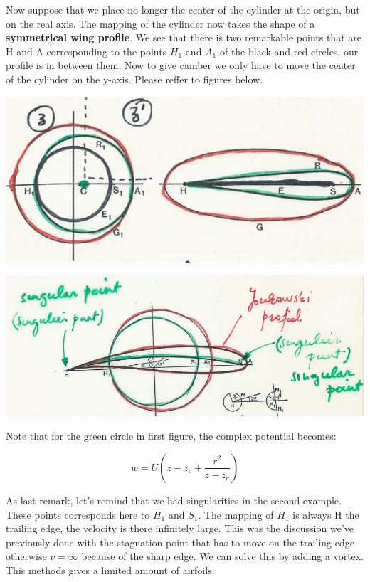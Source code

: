 		Now suppose that we place no longer the center of the cylinder at the origin, but on the real axis. The mapping of the cylinder now takes the shape of a \textbf{symmetrical wing profile}. We see that there is two remarkable points that are H and A corresponding to the points $H_1$ and $A_1$ of the black and red circles, our profile is in between them. Now to give camber we only have to move the center of the cylinder on the y-axis. Please reffer to figures below. 
		
		\begin{center}
		\begin{minipage}{0.45\textwidth}
		\includegraphics[scale=0.4]{ch2/31}
		\end{minipage}
		\begin{minipage}{0.45\textwidth}
		\includegraphics[scale=0.3]{ch2/32}
		\end{minipage}
		\end{center}
		
		Note that for the green circle in first figure, the complex potential becomes:
		
		\begin{equation}
		w = U\left( z-z_c + \frac{r^2}{z-z_c} \right)
		\end{equation}
		
		As last remark, let's remind that we had singularities in the second example. These points corresponds here to $H_1$ and $S_1$. The mapping of $H_1$ is always H the trailing edge, the velocity is there infinitely large. This was the discussion we've previously done with the stagnation point that has to move on the trailing edge otherwise $v = \infty$ because of the sharp edge. We can solve this by adding a vortex. This methods gives a limited amount of airfoils. 